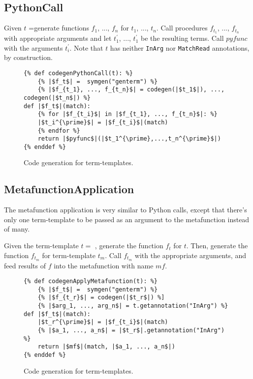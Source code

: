 \subsection{PythonCall}
Given $t$ =\PythonCall \space generate functions $f_1$, ..., $f_n$ for $t_1$, ..., $t_n$. Call procedures $f_{t_1}$, ..., $f_{t_n}$ with appropriate arguments and let $t_1^{\prime}$, ..., $t_1^{\prime}$ be the resulting terms. Call $pyfunc$ with the arguments $t_i^{\prime}$. Note that $t$ has neither \texttt{InArg} nor \texttt{MatchRead} annotations, by construction.

\begin{figure}
\begin{verbatim}
{% def codegenPythonCall(t): %}
	{% |$f_t$| =  symgen("genterm") %}
	{% |$f_{t_1}, ..., f_{t_n}$| = codegen(|$t_1$|), ..., codegen(|$t_n$|) %}
def |$f_t$|(match):
	{% for |$f_{t_i}$| in |$f_{t_1}, ..., f_{t_n}$|: %}
	|$t_i^{\prime}$| = |$f_{t_i}$|(match)
	{% endfor %}
	return |$pyfunc$|(|$t_1^{\prime},...,t_n^{\prime}$|)
{% enddef %}
\end{verbatim}
\caption{Code generation for \PythonCallNoArg \space term-templates.}
\label{codegen-term-pycall}
\end{figure}


\subsection{MetafunctionApplication}
The metafunction application is very similar to Python calls, except that there's only one term-template to be passed as an argument to the metafunction instead of many.

Given the term-template $t=$ \ApplyMetafunction, generate the function $f_t$ for $t$. Then, generate the function $f_{t_m}$ for term-template $t_m$. Call $f_{t_m}$ with the appropriate arguments, and feed results of $f$ into the metafunction with name $mf$.

\begin{figure}
\begin{verbatim}
{% def codegenApplyMetafunction(t): %}
	{% |$f_t$| =  symgen("genterm") %}
	{% |$f_{t_r}$| = codegen(|$t_r$|) %]
	{% |$arg_1, ..., arg_n$| = t.getannotation("InArg") %}
def |$f_t$|(match):
	|$t_r^{\prime}$| = |$f_{t_i}$|(match)
	{% |$a_1, ..., a_n$| = |$t_r$|.getannotation("InArg") %}
	return |$mf$|(match, |$a_1, ..., a_n$|)
{% enddef %}
\end{verbatim}
\caption{Code generation for \MetafunctionApplicationNoArgs \space term-templates.}
\label{codegen-term-mfapply}
\end{figure}

